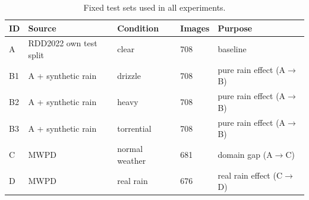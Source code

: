 \begin{table}[t]
\caption{Fixed test sets used in all experiments.}
\label{tab:tab_test_sets}
\begin{tabular}{lllll}
\toprule
ID & Source & Condition & Images & Purpose \\
\midrule
A & RDD2022 own test split & clear & 708 & baseline \\
B1 & A + synthetic rain & drizzle & 708 & pure rain effect (A$\to$B) \\
B2 & A + synthetic rain & heavy & 708 & pure rain effect (A$\to$B) \\
B3 & A + synthetic rain & torrential & 708 & pure rain effect (A$\to$B) \\
C & MWPD & normal weather & 681 & domain gap (A$\to$C) \\
D & MWPD & real rain & 676 & real rain effect (C$\to$D) \\
\bottomrule
\end{tabular}
\end{table}
